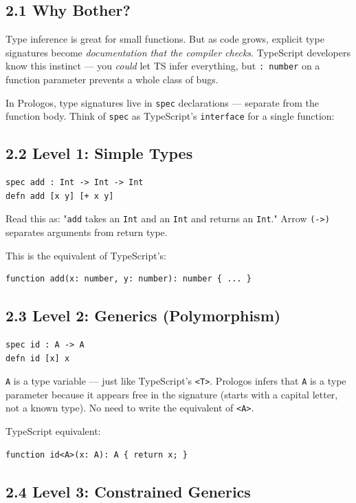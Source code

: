 \documentclass[11pt]{article}
\begin{document}
\subsection{2.1 Why Bother?}
\label{sec:orge42f79d}

Type inference is great for small functions. But as code grows, explicit
type signatures become \emph{documentation that the compiler checks}. TypeScript
developers know this instinct --- you \emph{could} let TS infer everything, but
\texttt{: number} on a function parameter prevents a whole class of bugs.

In Prologos, type signatures live in \texttt{spec} declarations --- separate from
the function body. Think of \texttt{spec} as TypeScript's \texttt{interface} for a
single function:
\subsection{2.2 Level 1: Simple Types}
\label{sec:orgf2e1eac}

\begin{verbatim}
spec add : Int -> Int -> Int
defn add [x y] [+ x y]
\end{verbatim}

Read this as: "\texttt{add} takes an \texttt{Int} and an \texttt{Int} and returns an \texttt{Int}."
Arrow \texttt{(->)} separates arguments from return type.

This is the equivalent of TypeScript's:
\begin{verbatim}
function add(x: number, y: number): number { ... }
\end{verbatim}
\subsection{2.3 Level 2: Generics (Polymorphism)}
\label{sec:org8ce224b}

\begin{verbatim}
spec id : A -> A
defn id [x] x
\end{verbatim}

\texttt{A} is a type variable --- just like TypeScript's \texttt{<T>}. Prologos infers
that \texttt{A} is a type parameter because it appears free in the signature
(starts with a capital letter, not a known type). No need to write the
equivalent of \texttt{<A>}.

TypeScript equivalent:
\begin{verbatim}
function id<A>(x: A): A { return x; }
\end{verbatim}
\subsection{2.4 Level 3: Constrained Generics}
\label{sec:org65b026d}
\end{document}
